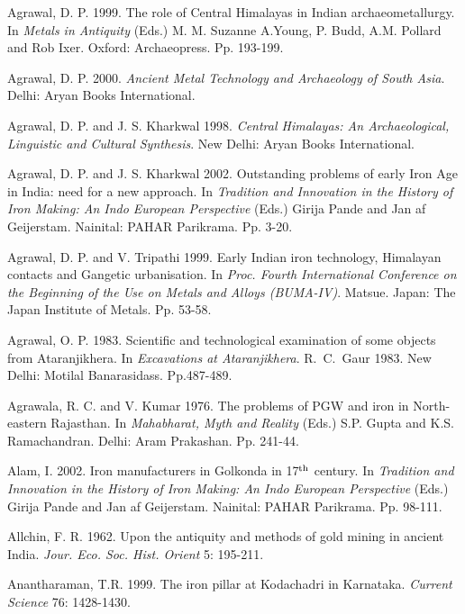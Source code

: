 \begin{thebibliography}{99}
\itemsep=0pt

 Agrawal, D. P. 1999. The role of Central Himalayas in Indian archaeometallurgy. In \textit{Metals in Antiquity} (Eds.) M. M. Suzanne A.Young, P. Budd, A.M. Pollard and Rob Ixer. Oxford: Archaeopress. Pp. 193-199.

 Agrawal, D. P. 2000. \textit{Ancient Metal Technology and Archaeology of South Asia}. Delhi: Aryan Books International.

 Agrawal, D. P. and J. S. Kharkwal 1998. \textit{Central Himalayas: An Archaeological, Linguistic and Cultural Synthesis}. New Delhi: Aryan Books International.

 Agrawal, D. P. and J. S. Kharkwal 2002. Outstanding problems of early Iron Age in India: need for a new approach. In \textit {Tradition and Innovation in the History of Iron Making: An Indo European Perspective} (Eds.) Girija Pande and Jan af Geijerstam. Nainital: PAHAR Parikrama. Pp. 3-20.

 Agrawal, D. P. and V. Tripathi 1999. Early Indian iron technology, Himalayan contacts and Gangetic urbanisation. In \textit{Proc. Fourth International Conference on the Beginning of the Use on Metals and Alloys (BUMA-IV)}. Matsue. Japan: The Japan Institute of Metals. Pp. 53-58.

 Agrawal, O. P. 1983. Scientific and technological examination of some objects from Ataranjikhera. In \textit{Excavations at Ataranjikhera}. R.~C.~Gaur 1983. New Delhi: Motilal Banarasidass. Pp.487-489.

 Agrawala, R. C. and V. Kumar 1976. The problems of PGW and iron in North-eastern Rajasthan. In \textit{Mahabharat, Myth and Reality} (Eds.) S.P. Gupta and K.S. Ramachandran. Delhi: Aram Prakashan. Pp. 241-44. 

 Alam, I. 2002. Iron manufacturers in Golkonda in 17$^{\rm th}$ century. In \textit{Tradition and Innovation in the History of Iron Making: An Indo European Perspective} (Eds.) Girija Pande and Jan af Geijerstam.  Nainital: PAHAR Parikrama. Pp. 98-111.

 Allchin, F. R. 1962. Upon the antiquity and methods of gold mining in ancient India. \textit{Jour. Eco. Soc. Hist. Orient} 5: 195-211.

 Anantharaman, T.R. 1999. The iron pillar at Kodachadri in Karnataka. \textit{Current Science} 76: 1428-1430.


\end{thebibliography}
